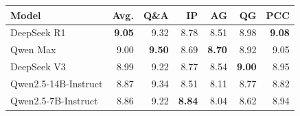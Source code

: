 \begin{tabular}{lrrrrrr}
\toprule
Model & Avg. & Q\&A & IP & AG & QG & PCC \\
\midrule
\rowcolor{paceTealLight}
DeepSeek R1 & \textbf{9.05} & 9.32 & 8.78 & 8.51 & 8.98 & \textbf{9.08} \\
Qwen Max & 9.00 & \textbf{9.50} & 8.69 & \textbf{8.70} & 8.92 & 9.05 \\
DeepSeek V3 & 8.99 & 9.22 & 8.77 & 8.54 & \textbf{9.00} & 8.95 \\
Qwen2.5-14B-Instruct & 8.87 & 9.34 & 8.51 & 8.11 & 8.77 & 8.82 \\
Qwen2.5-7B-Instruct & 8.86 & 9.22 & \textbf{8.84} & 8.04 & 8.62 & 8.94 \\
\bottomrule
\end{tabular}
